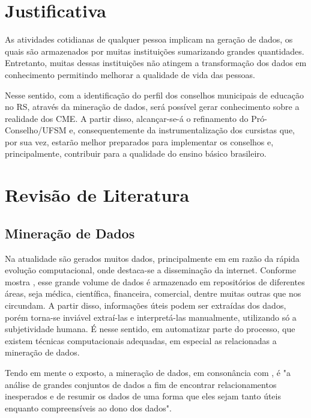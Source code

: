 \documentclass[projtg]{mdtufsm}
\begin{document}
\chapter{Justificativa}
As atividades cotidianas de qualquer pessoa implicam na geração de dados, os quais são armazenados por muitas instituições sumarizando grandes quantidades. Entretanto, muitas dessas instituições não atingem a transformação dos dados em conhecimento permitindo melhorar a qualidade de vida das pessoas. 

Nesse sentido, com a identificação do perfil dos conselhos municipais de educação no RS, através da mineração de dados, será possível gerar conhecimento sobre a realidade dos CME. A partir disso, alcançar-se-á o refinamento do Pró-Conselho/UFSM e, consequentemente da instrumentalização dos cursistas que, por sua vez, estarão melhor preparados para implementar os conselhos e, principalmente, contribuir para a qualidade do ensino básico brasileiro.   


\chapter{Revisão de Literatura}

\section{Mineração de Dados}

Na atualidade são gerados muitos dados, principalmente em em razão da rápida evolução computacional, onde destaca-se a disseminação da internet. Conforme mostra \cite{enia5}, esse grande volume de dados é armazenado em repositórios de diferentes áreas, seja médica, científica, financeira, comercial, dentre muitas outras que nos circundam. A partir disso, informações úteis podem ser extraídas dos dados, porém torna-se inviável extraí-las e interpretá-las manualmente, utilizando só a subjetividade humana. É nesse sentido, em automatizar parte do processo, que existem técnicas computacionais adequadas, em especial as relacionadas a mineração de dados.

Tendo em mente o exposto, a mineração de dados, em consonância com \cite{hand}, é "a análise de grandes conjuntos de dados a fim de encontrar relacionamentos inesperados e de resumir os dados de uma forma que eles sejam tanto úteis enquanto compreensíveis ao dono dos dados".
\end{document}
